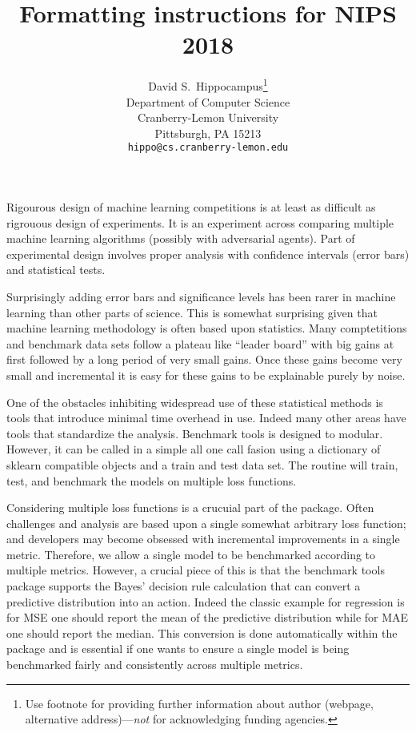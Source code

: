 \documentclass{article}
\title{Formatting instructions for NIPS 2018}
\author{
  David S.~Hippocampus\thanks{Use footnote for providing further
    information about author (webpage, alternative
    address)---\emph{not} for acknowledging funding agencies.} \\
  Department of Computer Science\\
  Cranberry-Lemon University\\
  Pittsburgh, PA 15213 \\
  \texttt{hippo@cs.cranberry-lemon.edu} \\
}
\begin{document}

\maketitle

Rigourous design of machine learning competitions is at least as difficult as rigrouous design of experiments.
It is an experiment across comparing multiple machine learning algorithms (possibly with adversarial agents)\@.
Part of experimental design involves proper analysis with confidence intervals (error bars) and statistical tests.

Surprisingly adding error bars and significance levels has been rarer in machine learning than other parts of science.
This is somewhat surprising given that machine learning methodology is often based upon statistics.
Many comptetitions and benchmark data sets follow a plateau like ``leader board'' with big gains at first followed by a long period of very small gains.
Once these gains become very small and incremental it is easy for these gains to be explainable purely by noise.

One of the obstacles inhibiting widespread use of these statistical methods is tools that introduce minimal time overhead in use.
Indeed many other areas have tools that standardize the analysis.  %
Benchmark tools is designed to modular.
However, it can be called in a simple all one call fasion using a dictionary of sklearn compatible objects and a train and test data set.
The routine will train, test, and benchmark the models on multiple loss functions.

Considering multiple loss functions is a crucuial part of the package.
Often challenges and analysis are based upon a single somewhat arbitrary loss function; and developers may become obsessed with incremental improvements in a single metric.
Therefore, we allow a single model to be benchmarked according to multiple metrics.
However, a crucial piece of this is that the benchmark tools package supports the Bayes' decision rule calculation that can convert a predictive distribution into an action.
Indeed the classic example for regression is for MSE one should report the mean of the predictive distribution while for MAE one should report the median.
This conversion is done automatically within the package and is essential if one wants to ensure a single model is being benchmarked fairly and consistently across multiple metrics.
\end{document}

